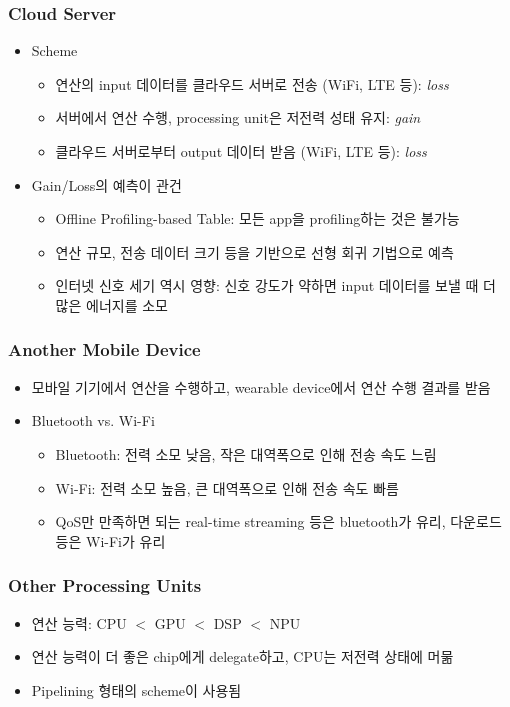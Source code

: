 \subsubsection*{Cloud Server}
\begin{itemize}
    \item Scheme
    \begin{itemize}
        \item 연산의 input 데이터를 클라우드 서버로 전송 (WiFi, LTE 등): \textit{loss}
        \item 서버에서 연산 수행, processing unit은 저전력 성태 유지: \textit{gain}
        \item 클라우드 서버로부터 output 데이터 받음 (WiFi, LTE 등): \textit{loss}
    \end{itemize}
    \newpage
    \item Gain/Loss의 예측이 관건
    \begin{itemize}
        \item Offline Profiling-based Table: 모든 app을 profiling하는 것은 불가능
        \item 연산 규모, 전송 데이터 크기 등을 기반으로 선형 회귀 기법으로 예측
        \item 인터넷 신호 세기 역시 영향: 신호 강도가 약하면 input 데이터를 보낼 때 더 많은 에너지를 소모
    \end{itemize}
\end{itemize}

\subsubsection*{Another Mobile Device}
\begin{itemize}
    \item 모바일 기기에서 연산을 수행하고, wearable device에서 연산 수행 결과를 받음
    \item Bluetooth vs. Wi-Fi
    \begin{itemize}
        \item Bluetooth: 전력 소모 낮음, 작은 대역폭으로 인해 전송 속도 느림
        \item Wi-Fi: 전력 소모 높음, 큰 대역폭으로 인해 전송 속도 빠름
        \item QoS만 만족하면 되는 real-time streaming 등은 bluetooth가 유리, 다운로드 등은 Wi-Fi가 유리
    \end{itemize}
\end{itemize}

\subsubsection*{Other Processing Units}
\begin{itemize}
    \item 연산 능력: CPU $<$ GPU $<$ DSP $<$ NPU
    \item 연산 능력이 더 좋은 chip에게 delegate하고, CPU는 저전력 상태에 머묾
    \item Pipelining 형태의 scheme이 사용됨
\end{itemize}

